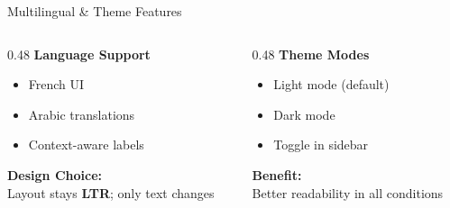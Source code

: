 \documentclass[aspectratio=169,11pt]{beamer}
\newcommand{\cmark}{\textcolor{accent3}{\ding{51}}}
\begin{document}
\begin{frame}{Multilingual \& Theme Features}

\begin{columns}[T]
  \begin{column}{0.48\textwidth}
    \textbf{\textcolor{accent1}{Language Support}}
    \begin{itemize}
      \item[\cmark] French UI
      \item[\cmark] Arabic translations
      \item[\cmark] Context-aware labels
    \end{itemize}
    
    \vspace{0.3cm}
    
    \textbf{Design Choice:}\\
    {\small Layout stays \textbf{LTR}; only text changes}
  \end{column}
  
  \begin{column}{0.48\textwidth}
    \textbf{\textcolor{accent1}{Theme Modes}}
    \begin{itemize}
      \item[\cmark] Light mode (default)
      \item[\cmark] Dark mode
      \item[\cmark] Toggle in sidebar
    \end{itemize}
    
    \vspace{0.3cm}
    
    \textbf{Benefit:}\\
    {\small Better readability in all conditions}
  \end{column}
\end{columns}

\end{frame}
\end{document}
